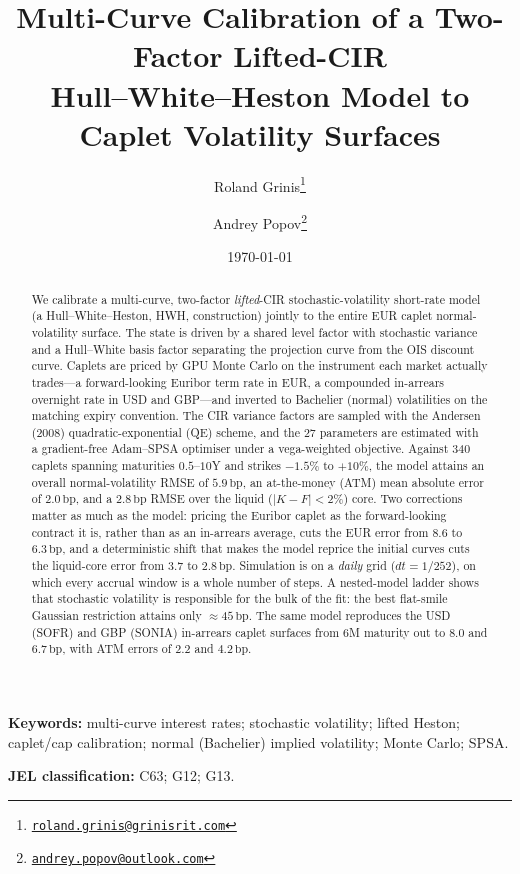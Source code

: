 \documentclass[11pt]{article}
\title{\bfseries Multi-Curve Calibration of a Two-Factor Lifted-CIR\\
Hull--White--Heston Model to Caplet Volatility Surfaces}
\author{Roland Grinis\thanks{\href{mailto:roland.grinis@grinisrit.com}{\texttt{roland.grinis@grinisrit.com}}}
\and Andrey Popov\thanks{\href{mailto:andrey.popov@outlook.com}{\texttt{andrey.popov@outlook.com}}}}
\date{\today}
\newcommand{\bp}{\,\text{bp}}
\begin{document}
\maketitle

\begin{abstract}
We calibrate a multi-curve, two-factor \emph{lifted}-CIR stochastic-volatility short-rate model
(a Hull--White--Heston, HWH, construction) jointly to the entire EUR caplet normal-volatility
surface. The state is driven by a shared level factor with stochastic variance and a Hull--White
basis factor separating the projection curve from the OIS discount curve. Caplets are priced by
GPU Monte Carlo on the instrument each market actually trades---a forward-looking Euribor term
rate in EUR, a compounded in-arrears overnight rate in USD and GBP---and inverted to Bachelier
(normal) volatilities on the matching expiry convention. The CIR variance factors are sampled with the Andersen (2008) quadratic-exponential
(QE) scheme, and the 27 parameters are estimated with a gradient-free Adam--SPSA optimiser under a
vega-weighted objective. Against 340 caplets spanning maturities \(0.5\)--\(10\)Y and strikes
\(-1.5\%\) to \(+10\%\), the model attains an overall normal-volatility RMSE of \(5.9\bp\), an
at-the-money (ATM) mean absolute error of \(2.0\bp\), and a \(2.8\bp\) RMSE over the liquid
(\(|K-F|<2\%\)) core. Two corrections matter as much as the model: pricing the Euribor caplet as the
forward-looking contract it is, rather than as an in-arrears average, cuts the EUR error from
\(8.6\) to \(6.3\bp\), and a deterministic shift that makes the model reprice the initial curves
cuts the liquid-core error from \(3.7\) to \(2.8\bp\). Simulation is on a \emph{daily} grid (\(dt=1/252\)), on which every accrual
window is a whole number of steps. A nested-model ladder shows that stochastic volatility is
responsible for the bulk of the fit: the best flat-smile Gaussian restriction attains only
\(\approx 45\bp\). The same model reproduces the USD (SOFR) and GBP (SONIA) in-arrears caplet
surfaces from \(6\)M maturity out to \(8.0\) and \(6.7\bp\), with ATM errors of \(2.2\) and \(4.2\bp\).
\end{abstract}

\medskip
\noindent\textbf{Keywords:} multi-curve interest rates; stochastic volatility; lifted Heston;
caplet/cap calibration; normal (Bachelier) implied volatility; Monte Carlo; SPSA.

\smallskip
\noindent\textbf{JEL classification:} C63; G12; G13.
\end{document}

